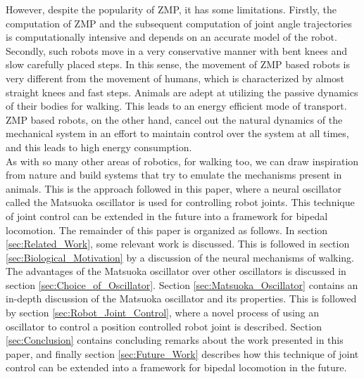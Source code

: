 \documentclass[12pt,twoside]{article}
\theoremstyle{plain}
\theoremstyle{definition}
\theoremstyle{remark}
\newcommand{\forceindent}{\leavevmode{\parindent=2em\indent}}
\begin{document}
\forceindent However, despite the popularity of ZMP, it has some limitations. Firstly, the computation of ZMP and the subsequent computation of joint angle trajectories is computationally intensive and depends on an accurate model of the robot. Secondly, such robots move in a very conservative manner with bent knees and slow carefully placed steps. In this sense, the movement of ZMP based robots is very different from the movement of humans, which is characterized by almost straight knees and fast steps. Animals are adept at utilizing the passive dynamics of their bodies for walking. This leads to an energy efficient mode of transport. ZMP based robots, on the other hand, cancel out the natural dynamics of the mechanical system in an effort to maintain control over the system at all times, and this leads to high energy consumption.\\
\forceindent As with so many other areas of robotics, for walking too, we can draw inspiration from nature and build systems that try to emulate the mechanisms present in animals. This is the approach followed in this paper, where a neural oscillator called the Matsuoka oscillator is used for controlling robot joints. This technique of joint control can be extended in the future into a framework for bipedal locomotion. The remainder of this paper is organized as follows. In section \ref{sec:Related_Work}, some relevant work is discussed. This is followed in section \ref{sec:Biological_Motivation} by a discussion of the neural mechanisms of walking. The advantages of the Matsuoka oscillator over other oscillators is discussed in section \ref{sec:Choice_of_Oscillator}.  Section \ref{sec:Matsuoka_Oscillator} contains an in-depth discussion of the Matsuoka oscillator and its properties. This is followed by section \ref{sec:Robot_Joint_Control}, where a novel process of using an oscillator to control a position controlled robot joint is described. Section \ref{sec:Conclusion} contains concluding remarks about the work presented in this paper, and finally section \ref{sec:Future_Work} describes how this technique of joint control can be extended into a framework for bipedal locomotion in the future.
\end{document}
